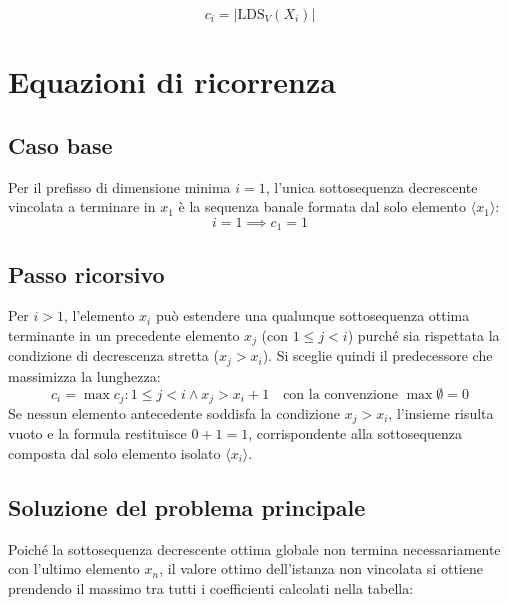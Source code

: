 \begin{equation*}
c_i = |\text{LDS}_V(X_i)|
\end{equation*}\section{Equazioni di ricorrenza}\subsection{Caso base}
Per il prefisso di dimensione minima $i = 1$, l'unica sottosequenza decrescente vincolata a terminare in $x_1$ è la sequenza banale formata dal solo elemento $\langle x_1 \rangle$:
\begin{equation*}
i = 1 \implies c_1 = 1
\end{equation*}\subsection{Passo ricorsivo}
Per $i > 1$, l'elemento $x_i$ può estendere una qualunque sottosequenza ottima terminante in un precedente elemento $x_j$ (con $1 \le j < i$) purché sia rispettata la condizione di decrescenza stretta ($x_j > x_i$). Si sceglie quindi il predecessore che massimizza la lunghezza:
\begin{equation*}
c_i = \max { c_j : 1 \le j < i \land x_j > x_i } + 1 \quad \text{con la convenzione } \max \emptyset = 0
\end{equation*}
Se nessun elemento antecedente soddisfa la condizione $x_j > x_i$, l'insieme risulta vuoto e la formula restituisce $0 + 1 = 1$, corrispondente alla sottosequenza composta dal solo elemento isolato $\langle x_i \rangle$.\subsection{Soluzione del problema principale}
Poiché la sottosequenza decrescente ottima globale non termina necessariamente con l'ultimo elemento $x_n$, il valore ottimo dell'istanza non vincolata si ottiene prendendo il massimo tra tutti i coefficienti calcolati nella tabella:
